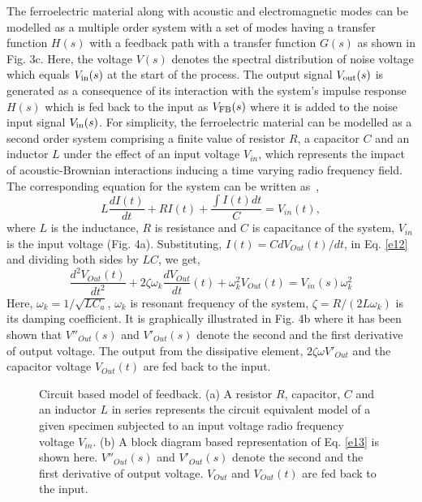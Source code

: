 \documentclass[12pt,column,showpacs,pre,preprintnumbers,amsmath,amssymb,aps,standalone]{revtex4-2}
\begin{document}
The ferroelectric material along with acoustic and electromagnetic modes can be modelled as a multiple order system with a set of modes having a transfer function $ H(s) $ with a feedback path with a transfer function $ G(s) $ as shown in Fig. 3c. Here, the voltage $V(s)$ denotes the spectral distribution of noise voltage which equals
$V_{\text{\scriptsize in}}(s)$ at the start of the process. The output signal
$V_{\text{\scriptsize out}}(s)$ is generated as a consequence of its
interaction with the system's impulse response $ H(s) $ which is fed back to the
input as $V_{\text{\scriptsize FB}}(s)$ where it is added to the noise
input signal $V_{\text{\scriptsize in}}(s)$.
For simplicity, the ferroelectric material can be modelled as a second order system comprising a finite value of resistor $ R $, a capacitor $ C $ and an inductor $ L $ under the effect of an input voltage $ V_{in} $, which represents the impact of  acoustic-Brownian interactions inducing a time varying radio frequency field. The corresponding equation for the system can be written as~\cite{22},
\begin{equation}
\label{e12}
L\frac{dI(t)}{dt}+RI(t)+\frac{\int I(t)dt}{C}=V_{in}(t),
\end{equation}
where $L$ is the inductance, $R$ is resistance and $C$ is capacitance of
the system, $V_{in}$ is the input voltage (Fig. 4a). Substituting, $I(t)= CdV_{Out}(t)/dt$, in Eq. \ref{e12} and dividing both sides by $ LC $, we get, 
\begin{equation}
\label{e13}
\frac{d^2V_{Out}(t)}{dt^2}+2\zeta \omega_k\frac{dV_{Out}}{dt}(t)+\omega_k^2V_{Out}(t)=V_{in}(s)\omega_k^2
\end{equation}
Here, $\omega_k=1/\sqrt{LC_a}$, $\omega_k$ is resonant frequency of the system, $\zeta=R/(2L\omega_k)$ is its damping coefficient. It is graphically illustrated in Fig. 4b where it has been shown that $ V''_{Out}(s) $ and $ V'_{Out}(s) $ denote the second and the first derivative of output voltage. The output from the dissipative element, $ 2\zeta \omega V'_{Out} $ and the capacitor voltage $ V_{Out}(t) $ are fed back to the input.
\begin{figure}[h!]
	\centering {}   
	\caption{\small Circuit based model of feedback. (a) A resistor $ R $, capacitor, $ C $ and an inductor $ L $ in series represents the circuit equivalent model of a given specimen subjected to an input voltage radio frequency voltage $ V_{in} $. (b)  A block diagram based representation of Eq. \ref{e13} is shown here. $ V''_{Out}(s) $ and $ V'_{Out}(s) $ denote the second and the first derivative of output voltage. $ V_{Out} $ and $ V_{Out}(t) $ are fed back to the input.
	}
\end{figure}
\end{document}
